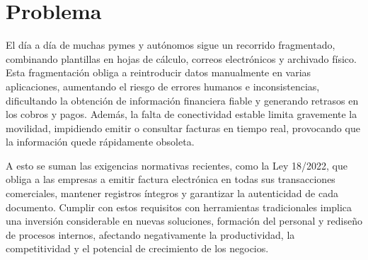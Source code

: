 
\section{Problema}
\begin{large}
El día a día de muchas pymes y autónomos sigue un recorrido fragmentado, combinando plantillas en hojas de cálculo, correos electrónicos y archivado físico. Esta fragmentación obliga a reintroducir datos manualmente en varias aplicaciones, aumentando el riesgo de errores humanos e inconsistencias, dificultando la obtención de información financiera fiable y generando retrasos en los cobros y pagos. Además, la falta de conectividad estable limita gravemente la movilidad, impidiendo emitir o consultar facturas en tiempo real, provocando que la información quede rápidamente obsoleta.

A esto se suman las exigencias normativas recientes, como la Ley 18/2022, que obliga a las empresas a emitir factura electrónica en todas sus transacciones comerciales, mantener registros íntegros y garantizar la autenticidad de cada documento. Cumplir con estos requisitos con herramientas tradicionales implica una inversión considerable en nuevas soluciones, formación del personal y rediseño de procesos internos, afectando negativamente la productividad, la competitividad y el potencial de crecimiento de los negocios.
\end{large}

